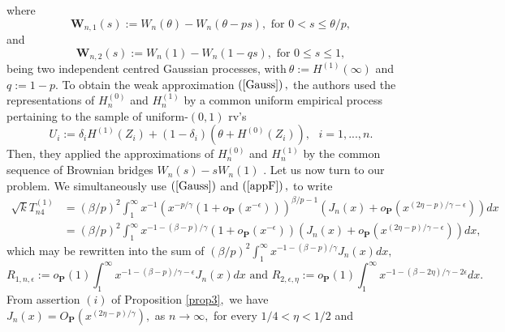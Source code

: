 \documentclass[reqno,openbib,runningheads,a4paper,12pt]{amsart}%
\begin{document}
where%
\[
\mathbf{W}_{n,1}\left(  s\right)  :=W_{n}\left(  \theta\right)  -W_{n}\left(
\theta-ps\right)  ,\text{ for }0<s\leq\theta/p,
\]
and%
\[
\mathbf{W}_{n,2}\left(  s\right)  :=W_{n}\left(  1\right)  -W_{n}\left(
1-qs\right)  ,\text{ for }0\leq s\leq1,
\]
being two independent centred Gaussian processes, with$\ \theta:=H^{\left(
1\right)  }\left(  \infty\right)  $ and $q:=1-p.$ To obtain the weak
approximation $\left(  \ref{Gauss}\right)  ,$ the authors used the
representations of $H_{n}^{\left(  0\right)  }$ and $H_{n}^{\left(  1\right)
}$ by a common uniform empirical process \citep[] []{Deheuvels1996} pertaining
to the sample of uniform-$\left(  0,1\right)  $ rv's%
\begin{equation}
U_{i}:=\delta_{i}H^{\left(  1\right)  }\left(  Z_{i}\right)  +\left(
1-\delta_{i}\right)  \left(  \theta+H^{\left(  0\right)  }\left(
Z_{i}\right)  \right)  ,\text{ }i=1,...,n.\label{unif}%
\end{equation}
Then, they applied the approximations of $H_{n}^{\left(  0\right)  }$ and
$H_{n}^{\left(  1\right)  }$ by the common sequence of Brownian bridges
$W_{n}\left(  s\right)  -sW_{n}\left(  1\right)  $ \citep[] []{CSCSHM86}. Let
us now turn to our problem. We simultaneously use $\left(  \ref{Gauss}\right)
$ and $\left(  \ref{appF}\right)  ,$ to write
\begin{align*}
\sqrt{k}T_{n4}^{\left(  1\right)  } &  =\left(  \beta/p\right)  ^{2}\int%
_{1}^{\infty}x^{-1}\left(  x^{-p/\gamma}\left(  1+o_{\mathbf{P}}\left(
x^{-\epsilon}\right)  \right)  \right)  ^{\beta/p-1}\left(  J_{n}\left(
x\right)  +o_{\mathbf{P}}\left(  x^{\left(  2\eta-p\right)  /\gamma-\epsilon
}\right)  \right)  dx\\
&  =\left(  \beta/p\right)  ^{2}\int_{1}^{\infty}x^{-1-\left(  \beta-p\right)
/\gamma}\left(  1+o_{\mathbf{P}}\left(  x^{-\epsilon}\right)  \right)  \left(
J_{n}\left(  x\right)  +o_{\mathbf{P}}\left(  x^{\left(  2\eta-p\right)
/\gamma-\epsilon}\right)  \right)  dx,
\end{align*}
which may be rewritten into the sum of $\left(  \beta/p\right)  ^{2}\int%
_{1}^{\infty}x^{-1-\left(  \beta-p\right)  /\gamma}J_{n}\left(  x\right)
dx,$
\[
R_{1,n,\epsilon}:=o_{\mathbf{P}}\left(  1\right)  \int_{1}^{\infty
}x^{-1-\left(  \beta-p\right)  /\gamma-\epsilon}J_{n}\left(  x\right)
dx\text{ and }R_{2,\epsilon,\eta}:=o_{\mathbf{P}}\left(  1\right)  \int%
_{1}^{\infty}x^{-1-\left(  \beta-2\eta\right)  /\gamma-2\epsilon}dx.
\]
From assertion $\left(  i\right)  $ of Proposition \ref{prop3}$,$ we have
$J_{n}\left(  x\right)  =O_{\mathbf{P}}\left(  x^{\left(  2\eta-p\right)
/\gamma}\right)  ,$ as $n\rightarrow\infty,$ for every $1/4<\eta<1/2$ and
\end{document}
